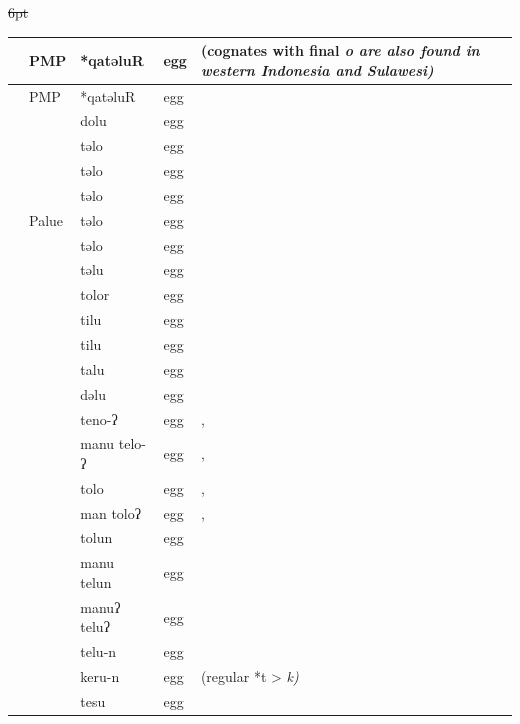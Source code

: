 {\st{6pt}\begin{xltabular}[l]{\linewidth}
{>{\hspace{-\tabcolsep}}l<{\hspace{-\tabcolsep}}
>{\hspace{-\tabcolsep}\enspace}lll
>{\raggedright\arraybackslash}X}
\lsptoprule
{}	&	PMP	&	*qatəluR	&	egg	&	(cognates with final \it{o} are also found in western Indonesia and Sulawesi)	\\	\midrule
\endfirsthead
\lsptoprule
{}	&	PMP	&	*qatəluR	&	egg	&	\\	\midrule
\endhead
	&		&	dolu	&	egg	&		\\
\rcl	&		&	təlo	&	egg	&		\\
\rcl	&		&	təlo	&	egg	&		\\
\rcl	&		&	təlo	&	egg	&		\\
\rcl	&	Palu{\Q}e	&	təlo	&	egg	&		\\
\rcl	&		&	təlo	&	egg	&		\\
	&		&	təlu	&	egg	&		\\
\rcl	&		&	tolor	&	egg	&		\\
	&		&	tilu	&	egg	&		\\
	&		&	tilu	&	egg	&		\\
	&		&	talu	&	egg	&		\\
	&		&	dəlu	&	egg	&		\\
\rcl	&	 	&	teno-ʔ	&	egg	&	, 	\\
\rcl	&		&	manu telo-ʔ	&	egg	&	, 	\\
\rcl	&		&	tolo	&	egg	&	, 	\\
\rcl	&		&	man toloʔ	&	egg	&	, 	\\
	&		&	tolun	&	egg	&		\\
	&		&	manu telun	&	egg	&		\\
	&		&	manuʔ teluʔ	&	egg	&		\\
	&		&	telu-n	&	egg	&		\\
	&		&	keru-n	&	egg	&	 (regular *t > \it{k})	\\
	&		&	tesu	&	egg	&		\\

\end{xltabular}}
